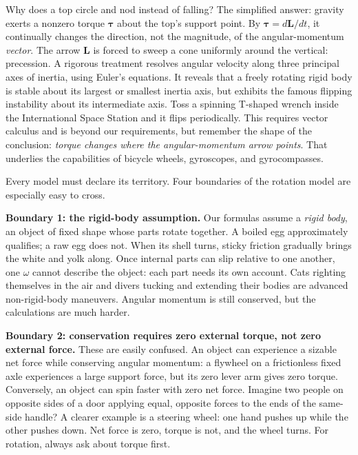 \begin{challenge}
Why does a top circle and nod instead of falling? The simplified answer: gravity exerts a nonzero torque \(\bm\tau\) about the top's support point. By \(\bm\tau=d\bm L/dt\), it continually changes the direction, not the magnitude, of the angular-momentum \emph{vector}. The arrow \(\bm L\) is forced to sweep a cone uniformly around the vertical: precession. A rigorous treatment resolves angular velocity along three principal axes of inertia, using Euler's equations. It reveals that a freely rotating rigid body is stable about its largest or smallest inertia axis, but exhibits the famous flipping instability about its intermediate axis. Toss a spinning T-shaped wrench inside the International Space Station and it flips periodically. This requires vector calculus and is beyond our requirements, but remember the shape of the conclusion: \emph{torque changes where the angular-momentum arrow points}. That underlies the capabilities of bicycle wheels, gyroscopes, and gyrocompasses.
\end{challenge}


Every model must declare its territory. Four boundaries of the rotation model are especially easy to cross.

\textbf{Boundary 1: the rigid-body assumption.} Our formulas assume a \emph{rigid body}, an object of fixed shape whose parts rotate together. A boiled egg approximately qualifies; a raw egg does not. When its shell turns, sticky friction gradually brings the white and yolk along. Once internal parts can slip relative to one another, one \(\omega\) cannot describe the object: each part needs its own account. Cats righting themselves in the air and divers tucking and extending their bodies are advanced non-rigid-body maneuvers. Angular momentum is still conserved, but the calculations are much harder.

\textbf{Boundary 2: conservation requires zero external torque, not zero external force.} These are easily confused. An object can experience a sizable net force while conserving angular momentum: a flywheel on a frictionless fixed axle experiences a large support force, but its zero lever arm gives zero torque. Conversely, an object can spin faster with zero net force. Imagine two people on opposite sides of a door applying equal, opposite forces to the ends of the same-side handle? A clearer example is a steering wheel: one hand pushes up while the other pushes down. Net force is zero, torque is not, and the wheel turns. For rotation, always ask about torque first.

